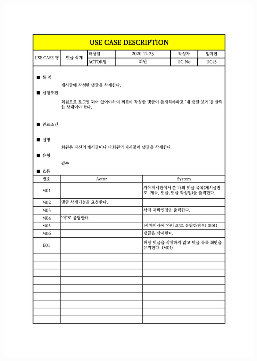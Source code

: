 {{{{{{{{{{{{{{{{{{{{{{{{{{{{{{{{{{{{{{{{{{{{{{{{\includegraphics[width=1.1\textwidth]{./Figure/Design/Display/usecase/045.pdf} \\
}}}}}}}}}}}}}}}}}}}}}}}}}}}}}}}}}}}}}}}}}}}}}}}}
